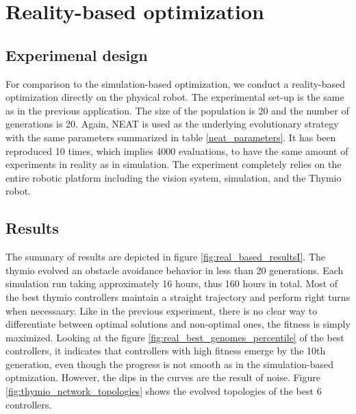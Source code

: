 \section{Reality-based optimization}

\subsection{Experimenal design}

For comparison to the simulation-based optimization, we conduct a reality-based optimization directly on the physical robot. The experimental set-up is the same as in the previous application. The size of the population is 20 and the number of generations is 20. Again, NEAT is used as the underlying evolutionary strategy with the same parameters summarized in table \ref{neat_parameters}. It has been reproduced 10 times, which implies 4000 evaluations, to have the same amount of experiments in reality as in simulation. The experiment completely relies on the entire robotic platform including the vision system, simulation, and the Thymio robot.

\subsection{Results}

The summary of results are depicted in figure \ref{fig:real_based_resultsI}. The thymio evolved an obstacle avoidance behavior in less than 20 generations. Each simulation run taking  approximately 16 hours, thus 160 hours in total. Most of the best thymio controllers maintain a straight trajectory and perform right turns when necessaary. Like in the previous experiment, there is no clear way to differentiate between optimal solutions and non-optimal ones, the fitness is simply maximized. Looking at the figure \ref{fig:real_best_genomes_percentile} of the best controllers, it indicates that controllers with high fitness emerge by the 10th generation, even though the progress is not smooth as in the simulation-based optmization. However, the dips in the curves are the result of noise. Figure \ref{fig:thymio_network_topologies} shows the evolved topologies of the best 6 controllers.

